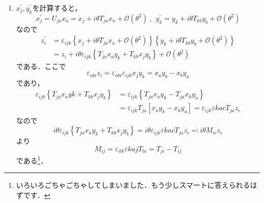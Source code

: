 \documentclass[a4paper,pdflatex,ja=standard]{bxjsarticle}
\begin{document}
\begin{enumerate}
\begin{enumerate}
    \item 

    $x^{\prime}_{j},y_{k}^{\prime}$を計算すると，
    \begin{equation}
      x^{\prime}_{j}
      =
      U_{ja}x_{a}
      =
      x_{j}+i\theta T_{ja}x_{a}+\mathcal{O}(\theta^2)
      \ ,\ \ 
      y_{k}^{\prime}
      =
      y_{k}+i\theta T_{kb}y_{b}+\mathcal{O}(\theta^2)
    \end{equation}
    なので
    \begin{align}
      z_{i}^{\prime}
      &=
      \varepsilon_{ijk}
      \left\{  
        x_{j}+i\theta T_{ja}x_{a}+\mathcal{O}(\theta^2)
      \right\}
      \left\{  
        y_{k}+i\theta T_{kb}y_{b}+\mathcal{O}(\theta^2)
      \right\}
      \nonumber
      \\
      &=
      z_{i}
      +
      i\theta\varepsilon_{ijk}
      \left\{  
        T_{ja}x_{a}y_{k}
        +
        T_{kb}x_{j}y_{b}
      \right\}
      +
      \mathcal{O}(\theta^2)
      \label{z_prime}
    \end{align}
    である．ここで
    \begin{equation}
      \varepsilon_{abi}z_{i}
      =
      \varepsilon_{abi}\varepsilon_{ijk}x_{j}y_{k}
      =
      x_{a}y_{b}-x_{b}y_{a}
    \end{equation}
    であり，
    \begin{align}
      \varepsilon_{ijk}
      \left\{  
        T_{ja}x_{a}y{k}
        +
        T_{kb}x_{j}y_{b}
      \right\}
      &=
      \varepsilon_{ijk}
      \left\{  
        T_{ja}x_{a}y_{k}
        -
        T_{ja}x_{k}y_{a}
      \right\}
      \nonumber
      \\
      &=
      \varepsilon_{ijk}T_{ja}
      \left[ x_{a}y_{k}-x_{k}y_{a} \right]
      =
      \varepsilon_{ijk}\varepsilon{kac}T_{ja}z_{c}
    \end{align}
    なので
    \begin{equation}
      i\theta\varepsilon_{ijk}
      \left\{  
        T_{ja}x_{a}y_{k}
        +
        T_{kb}x_{j}y_{b}
      \right\}
      =
      i\theta\varepsilon_{ijk}\varepsilon{kac}T_{ja}z_{c}
      \eqqcolon
      i\theta M_{ic}z_{c}
    \end{equation}
    より
    \begin{equation}
      M_{ij}
      =
      \varepsilon_{ilk}\varepsilon{kaj}T_{la}
      =
      T_{ji}-T_{ij}
    \end{equation}
    である\footnote{いろいろごちゃごちゃしてしまいました．もう少しスマートに答えられるはずです．}．
  \end{enumerate}
\end{enumerate}
\end{document}
